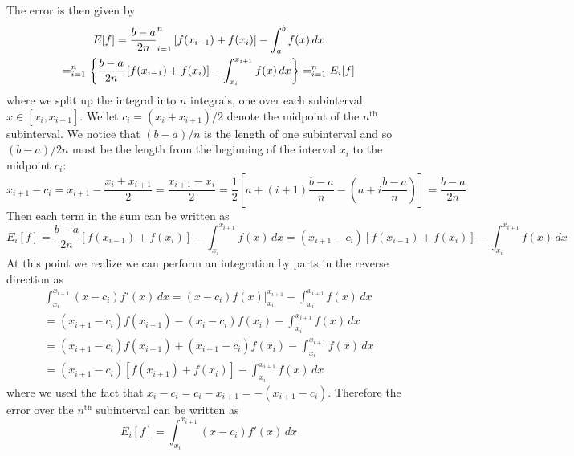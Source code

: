 \documentclass[11pt]{article}
\let\sumop\relax
\begin{document}
The error is then given by
\begin{multline*}
  E[f] = \frac{b-a}{2n} \sumop_{i=1}^n \left[ f(x_{i-1}) + f(x_i) \right] - \int_a^b f(x) \, dx \\
  = \sumop_{i=1}^n \left\{ \frac{b-a}{2n} \left[ f(x_{i-1}) + f(x_i) \right] - \int_{x_i}^{x_{i+1}} f(x) \, dx \right\}
  = \sumop_{i=1}^n E_i[f]
\end{multline*}
where we split up the integral into $n$ integrals, one over each subinterval $x \in [x_{i}, x_{i+1}]$. We let $c_i = (x_{i} + x_{i+1})/2$ denote the midpoint of the $n^\mathrm{th}$ subinterval. We notice that $(b-a)/n$ is the length of one subinterval and so $(b-a)/2n$ must be the length from the beginning of the interval $x_i$ to the midpoint $c_i$:
\begin{equation*}
  x_{i+1} - c_i = x_{i+1} - \frac{x_{i} + x_{i+1}}{2} = \frac{x_{i+1} - x_i}{2}
  = \frac{1}{2} \left[ a + (i+1)\frac{b-a}{n} - \left( a + i\frac{b-a}{n} \right) \right]
  = \frac{b-a}{2n}
\end{equation*}
Then each term in the sum can be written as
\begin{equation*}
  E_i[f]
  = \frac{b-a}{2n} \left[ f(x_{i-1}) + f(x_i) \right] - \int_{x_i}^{x_{i+1}} f(x) \, dx
  = (x_{i+1} - c_i) \left[ f(x_{i-1}) + f(x_i) \right] - \int_{x_i}^{x_{i+1}} f(x) \, dx
\end{equation*}
At this point we realize we can perform an integration by parts in the reverse direction as 
\begin{multline*}
  \int_{x_i}^{x_{i+1}} (x-c_i) f'(x) \, dx
  = (x-c_i)f(x) \Big\rvert_{x_i}^{x_{i+1}} - \int_{x_i}^{x_{i+1}} f(x) \, dx \\
  = (x_{i+1}-c_i)f(x_{i+1}) - (x_i-c_i)f(x_i) - \int_{x_i}^{x_{i+1}} f(x) \, dx \\
  = (x_{i+1}-c_i)f(x_{i+1}) + (x_{i+1}-c_i)f(x_i) - \int_{x_i}^{x_{i+1}} f(x) \, dx \\
  = (x_{i+1}-c_i)\left[ f(x_{i+1}) + f(x_i) \right] - \int_{x_i}^{x_{i+1}} f(x) \, dx
\end{multline*}
where we used the fact that $x_i - c_i = c_i - x_{i+1} = - (x_{i+1} - c_i)$. Therefore the error over the $n^\mathrm{th}$ subinterval can be written as
\begin{equation*}
  E_i[f] = \int_{x_i}^{x_{i+1}} (x-c_i) f'(x) \, dx
\end{equation*}
\end{document}

